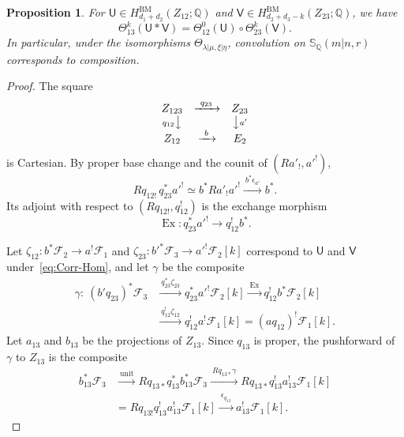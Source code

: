 \documentclass[11pt,a4paper]{amsart}
\newtheorem{proposition}[theorem]{Proposition}
\theoremstyle{definition}
\theoremstyle{remark}
\newcommand{\Q}{\mathbb Q}
\newcommand{\bS}{\mathbb S}
\newcommand{\BM}{\mathrm{BM}}
\newcommand{\lm}{\lambda|\mu}
\newcommand{\xh}{\xi|\eta}
\numberwithin{equation}{section}
\begin{document}
\begin{proposition}\label{prop:BM-multiplication}
For $\mathsf U\in H^{\BM}_{d_1+d_2}(Z_{12};\Q)$ and
$\mathsf V\in H^{\BM}_{d_2+d_3-k}(Z_{23};\Q)$, we have
\begin{equation}\label{eq:BM-Hom-product}
\Theta^k_{13}(\mathsf U*\mathsf V)
=\Theta^0_{12}(\mathsf U)\circ\Theta^k_{23}(\mathsf V).
\end{equation}
In particular, under the isomorphisms $\Theta_{\lm,\xh}$, convolution on
$\bS_\Q(m|n,r)$ corresponds to composition.
\end{proposition}
\begin{proof}
The square
$$
\begin{array}{ccc}
Z_{123}&\xrightarrow{\ q_{23}\ }&Z_{23}\\
{\scriptstyle q_{12}}\big\downarrow&&\big\downarrow{\scriptstyle a'}\\
Z_{12}&\xrightarrow{\ b\ }&E_2
\end{array}
$$
is Cartesian. By proper base change and the counit of $(Ra'_!,a'^!)$,
$$
Rq_{12!}\,q_{23}^*a'^!\simeq b^*Ra'_!a'^!
\xrightarrow{\ b^*\epsilon_{a'}\ }b^*.
$$
Its adjoint with respect to $(Rq_{12!},q_{12}^!)$ is the exchange
morphism
\begin{equation}\label{eq:exchange}
\operatorname{Ex}:q_{23}^*a'^!\longrightarrow q_{12}^!b^*.
\end{equation}

Let $\zeta_{12}:b^*\mathcal F_2\to a^!\mathcal F_1$ and
$\zeta_{23}:b'^*\mathcal F_3\to a'^!\mathcal F_2[k]$
correspond to $\mathsf U$ and $\mathsf V$ under~\eqref{eq:Corr-Hom}, and
let $\gamma$ be the composite
\begin{equation}\label{eq:kernel-composition}
\begin{aligned}
\gamma:\ (b'q_{23})^*\mathcal F_3
&\xrightarrow{\ q_{23}^*\zeta_{23}\ }q_{23}^*a'^!\mathcal F_2[k]
\xrightarrow{\ \operatorname{Ex}\ }q_{12}^!b^*\mathcal F_2[k]\\
&\xrightarrow{\ q_{12}^!\zeta_{12}\ }q_{12}^!a^!\mathcal F_1[k]
=(aq_{12})^!\mathcal F_1[k].
\end{aligned}
\end{equation}
Let $a_{13}$ and $b_{13}$ be the projections of $Z_{13}$. Since $q_{13}$
is proper, the pushforward of $\gamma$ to $Z_{13}$ is the composite
\begin{equation}\label{eq:kernel-pushforward}
\begin{aligned}
b_{13}^*\mathcal F_3
&\xrightarrow{\ \mathrm{unit}\ }Rq_{13*}q_{13}^*b_{13}^*\mathcal F_3
\xrightarrow{\ Rq_{13*}\gamma\ }Rq_{13*}q_{13}^!a_{13}^!\mathcal F_1[k]\\
&=Rq_{13!}q_{13}^!a_{13}^!\mathcal F_1[k]
\xrightarrow{\ \epsilon_{q_{13}}\ }a_{13}^!\mathcal F_1[k].
\end{aligned}
\end{equation}


\end{proof}
\end{document}
